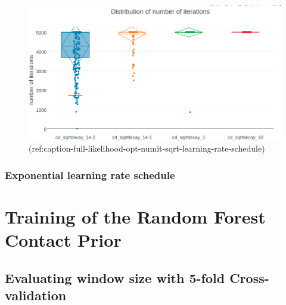 \documentclass[12pt,a4paper,twoside]{book}
\theoremstyle{definition}
\theoremstyle{definition}
\theoremstyle{remark}
\begin{document}
\begin{figure}

{\centering \includegraphics[width=0.9\linewidth]{img/full_likelihood/appendix/distribution_numiterations_against_alpha1e-4_sqrtdecay} 

}

\caption{(ref:caption-full-likelihood-opt-numit-sqrt-learning-rate-schedule)}\label{fig:full-likelihood-opt-numit-sqrt-learning-rate-schedule}
\end{figure}

\subsection{Exponential learning rate
schedule}\label{exponential-learning-rate-schedule-1}

\chapter{Training of the Random Forest Contact
Prior}\label{training-of-the-random-forest-contact-prior}

\section{Evaluating window size with 5-fold
Cross-validation}\label{rf-window-size}
\end{document}
